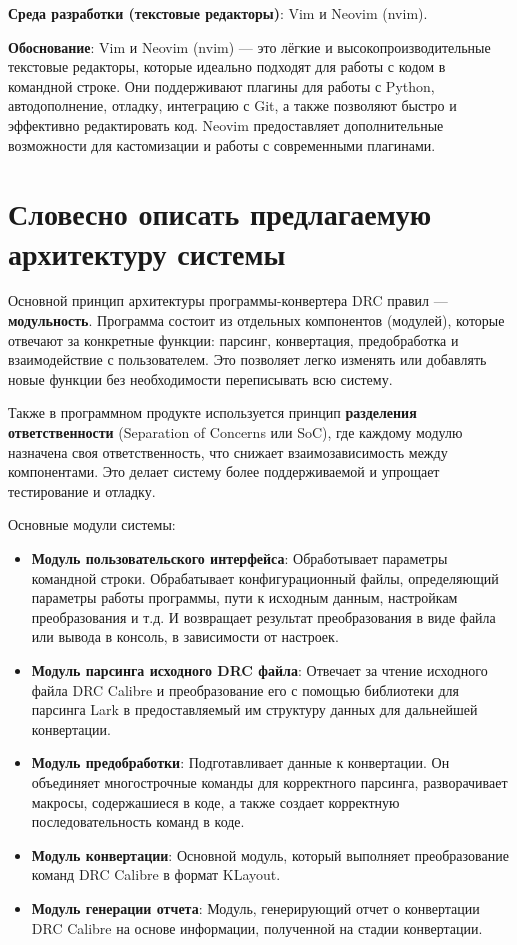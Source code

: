 \textbf{Среда разработки (текстовые редакторы)}: Vim и Neovim (nvim).\par
\textbf{Обоснование}: Vim и Neovim (nvim) --- это лёгкие
и высокопроизводительные текстовые редакторы,
которые идеально подходят для работы с кодом в командной строке.
Они поддерживают плагины для работы с Python, автодополнение, отладку,
интеграцию с Git, а также позволяют быстро
и эффективно редактировать код.
Neovim предоставляет дополнительные возможности
для кастомизации и работы с современными плагинами.

\section{Словесно описать предлагаемую архитектуру системы}

Основной принцип архитектуры программы-конвертера DRC правил
--- \textbf{модульность}.
Программа состоит из отдельных компонентов (модулей),
которые отвечают за конкретные функции:
парсинг, конвертация, предобработка и взаимодействие с пользователем.
Это позволяет легко изменять или добавлять новые функции
без необходимости переписывать всю систему.\par
Также в программном продукте используется принцип
\textbf{разделения ответственности} 
(Separation of Concerns или SoC), где каждому модулю назначена
своя ответственность, что снижает взаимозависимость между компонентами.
Это делает систему более поддерживаемой и упрощает тестирование и отладку.

Основные модули системы:

\begin{itemize}
	\item \textbf{Модуль пользовательского интерфейса}:
	Обработывает параметры командной строки.
	Обрабатывает конфигурационный файлы,
	определяющий параметры работы программы,
	пути к исходным данным, настройкам преобразования и т.д.
	И возвращает результат преобразования в виде файла или вывода в консоль,
	в зависимости от настроек.
	\item \textbf{Модуль парсинга исходного DRC файла}:
	Отвечает за чтение исходного файла DRC Calibre
	и преобразование его с помощью библиотеки для парсинга Lark
	в предоставляемый им структуру данных для дальнейшей конвертации.
	\item \textbf{Модуль предобработки}:
	Подготавливает данные к конвертации.
	Он объединяет многострочные команды для корректного парсинга,
	разворачивает макросы, содержашиеся в коде, а также
	создает корректную последовательность команд в коде.
	\item \textbf{Модуль конвертации}:
	Основной модуль, который выполняет преобразование команд DRC Calibre
	в формат KLayout.
	\item \textbf{Модуль генерации отчета}:
	Модуль, генерирующий отчет о конвертации DRC Calibre на основе информации,
	полученной на стадии конвертации.
\end{itemize}

